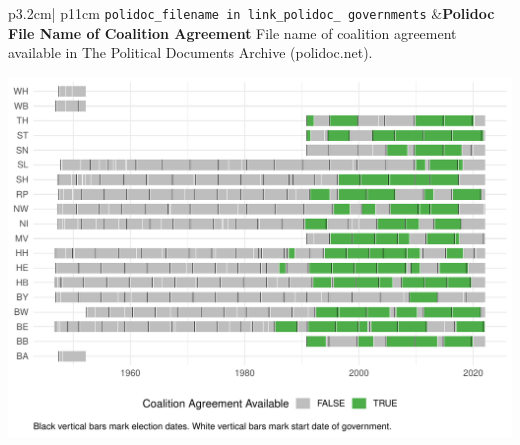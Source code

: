 \documentclass[
]{article}
\begin{document}
\begin{longtable}{p{3.2cm}| p{11cm}}
\texttt{polidoc\_filename in link\_polidoc\_
governments} &\textbf{Polidoc File Name of Coalition Agreement}\newline 
File name of coalition agreement available in The Political Documents Archive (polidoc.net).


\hspace*{.25cm}
\begin{minipage}[t]{\linewidth }
\vspace{0pt}
\includegraphics[width = \linewidth]{cbpolidoc/pltpolidocgov.pdf}
\end{minipage}





\end{longtable}
\end{document}
